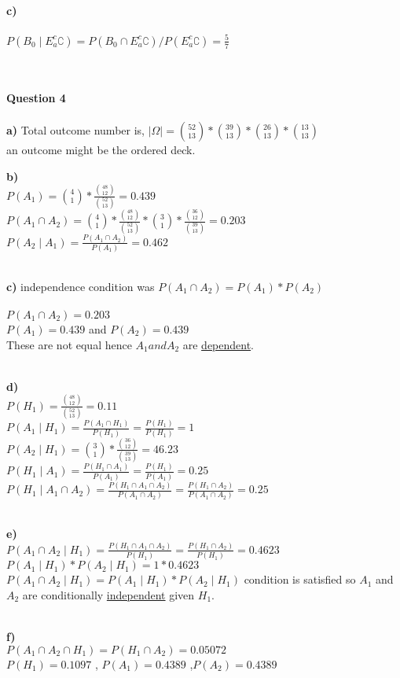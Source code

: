 \documentclass{METUHW} %
\begin{document}
\textbf{c)}\\
\centering\\

$P(B_0\mid E_a^c\complement)=P(B_0\cap E_a^c\complement)/P(E_a^c\complement)=\frac{5}{7}$

\raggedright\\
\text{}\\
\textbf{\large Question 4}\\
\text{}\\
\textbf{a)} Total outcome number is, $\rvert \Omega \lvert = \binom{52}{13}*\binom{39}{13}*\binom{26}{13}*\binom{13}{13}$\\
\centering
an outcome might be the ordered deck.

\raggedright
\textbf{b)}\\
\centering
$P(A_1) = \binom{4}{1}*\frac{\binom{48}{12}}{\binom{52}{13}}=0.439$\\
$P(A_1\cap A_2) = \binom{4}{1}*\frac{\binom{48}{12}}{\binom{52}{13}}*\binom{3}{1}*\frac{\binom{36}{12}}{\binom{39}{13}} = 0.203$\\
$P(A_2\mid A_1) = \frac{P(A_1\cap A_2)}{P(A_1)} = 0.462$\\

\raggedright
\text{}\\
\textbf{c)} independence condition was $P(A_1\cap A_2) = P(A_1)*P(A_2) $\\
\centering\\
$P(A_1\cap A_2)= 0.203$\\
$P(A_1) = 0.439$ and $P(A_2) = 0.439$\\
These are not equal hence $A_1 and A_2$ are \underline{dependent}.

\raggedright
\text{}\\
\textbf{d)}\\
\centering
$P(H_1)=\frac{\binom{48}{12}}{\binom{52}{13}} = 0.11$\\
$P(A_1\mid H_1) =\frac{P(A_1\cap H_1)}{P(H_1)}=\frac{P(H_1)}{P(H_1)}=1$\\
$P(A_2\mid H_1) = \binom{3}{1}*\frac{\binom{36}{12}}{\binom{39}{13}} = 46.23$\\
$P(H_1\mid A_1) = \frac{P(H_1\cap A_1)}{P(A_1)}=\frac{P(H_1)}{P(A_1)}= 0.25$\\
$P(H_1\mid A_1 \cap A_2 ) = \frac{P(H_1\cap A_1 \cap A_2)}{P(A_1 \cap A_2)}=\frac{P(H_1\cap A_2)}{P(A_1 \cap A_2)}=0.25$\\
\raggedright
\text{}\\
\textbf{e)}\\
\centering
$P(A_1\cap A_2\mid H_1)=\frac{P(H_1\cap A_1\cap A_2)}{P(H_1)}=\frac{P(H_1\cap A_2)}{P(H_1)}=0.4623$\\
$P(A_1\mid H_1)*P(A_2\mid H_1) = 1*0.4623$\\
$P(A_1\cap A_2 \mid H_1)=P(A_1\mid H_1)*P(A_2 \mid H_1)$ condition is satisfied so $A_1$ and $A_2$ are conditionally \underline{independent} given $H_1$.
\text{}\\
\text{}\\
\raggedright
\textbf{f)}\\
\centering
$P(A_1\cap A_2 \cap H_1)= P(H_1 \cap A_2) = 0.05072$\\
$P(H_1) = 0.1097$ , $P(A_1)=0.4389$ ,$P(A_2)=0.4389$\\
\end{document}
